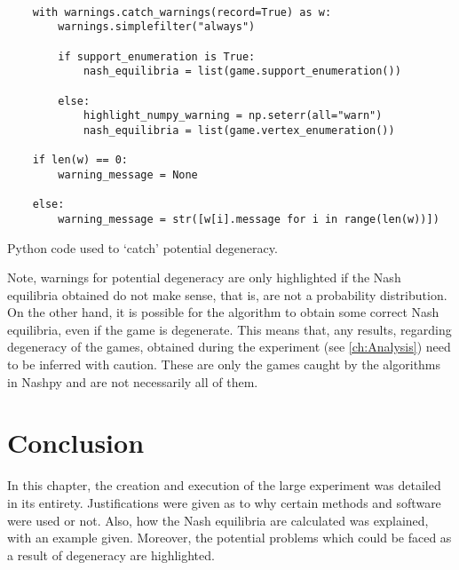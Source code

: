 \begin{listing}
    \begin{verbatim}
    
    with warnings.catch_warnings(record=True) as w:
        warnings.simplefilter("always")

        if support_enumeration is True:
            nash_equilibria = list(game.support_enumeration())

        else:
            highlight_numpy_warning = np.seterr(all="warn")
            nash_equilibria = list(game.vertex_enumeration())

    if len(w) == 0:
        warning_message = None

    else:
        warning_message = str([w[i].message for i in range(len(w))])

    \end{verbatim}
    \caption{Python code used to `catch' potential degeneracy.}\label{ls:warn_code}
\end{listing}

Note, warnings for potential degeneracy are only highlighted if the
Nash equilibria obtained do not make sense, that is, are not a probability
distribution. On the other hand, it is possible for the algorithm to obtain some
correct Nash equilibria, even if the game is degenerate. This means that, any results, regarding degeneracy of the games, obtained during the
experiment (see \autoref{ch:Analysis}) need to be inferred with caution. These
are only the games caught by the algorithms in Nashpy and are not necessarily
all of them.

\section{Conclusion}
In this chapter, the creation and execution of the large experiment was
detailed in its entirety. Justifications were given as to why certain methods
and software were used or not. Also, how the Nash equilibria are calculated was
explained, with an example given. Moreover, the potential problems which could
be faced as a result of degeneracy are highlighted.
